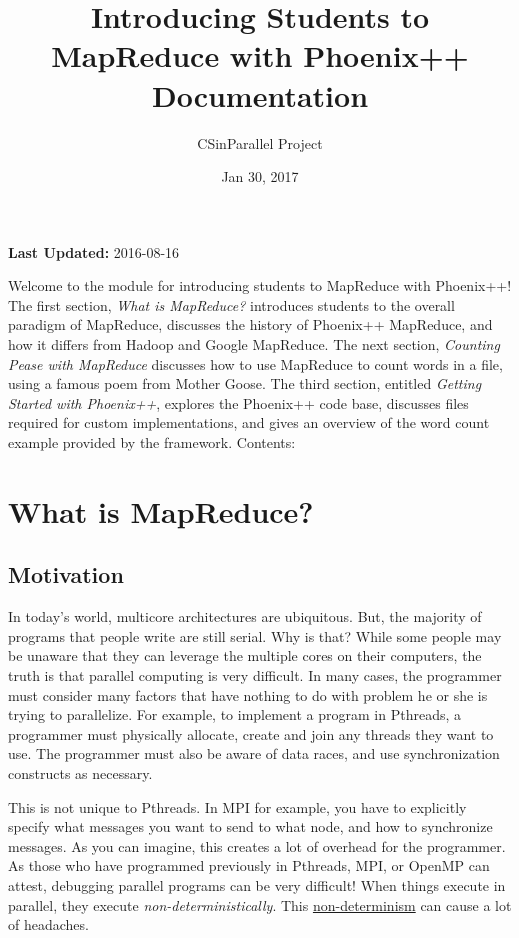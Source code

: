 \documentclass[letterpaper,10pt,openany,oneside]{sphinxmanual}
\title{Introducing Students to MapReduce with Phoenix++ Documentation}
\date{Jan 30, 2017}
\author{CSinParallel Project}
\begin{document}
\maketitle
\tableofcontents
{}\label{index::doc}


\textbf{Last Updated:} 2016-08-16

Welcome to the module for introducing students to MapReduce with Phoenix++!
The first section, \emph{What is MapReduce?} introduces students to the overall
paradigm of MapReduce, discusses the history of Phoenix++ MapReduce, and how it
differs from Hadoop and Google MapReduce. The next section, \emph{Counting Pease
with MapReduce} discusses how to use MapReduce to count words in a file, using
a famous poem from Mother Goose. The third section, entitled \emph{Getting Started
with Phoenix++}, explores the Phoenix++ code base, discusses files required for
custom implementations, and gives an overview of the word count example provided
by the framework.
Contents:


\chapter{What is MapReduce?}
\label{MRIntro/MRIntro::doc}\label{MRIntro/MRIntro:introducing-students-to-mapreduce-with-phoenix}\label{MRIntro/MRIntro:what-is-mapreduce}

\section{Motivation}
\label{MRIntro/MRIntro:motivation}
In today's world, multicore architectures are ubiquitous. But, the majority of
programs that people write are still serial. Why is that? While some people may
be unaware that they can leverage the multiple cores on their computers, the
truth is that parallel computing is very difficult. In many cases, the
programmer must consider many factors that have nothing to do with problem he
or she is trying to parallelize. For example, to implement a program in Pthreads,
a programmer must physically allocate, create and join any threads they want to
use. The programmer must also be aware of data races, and use synchronization
constructs as necessary.

This is not unique to Pthreads. In MPI for example, you have to explicitly
specify what messages you want to send to what node, and how to synchronize
messages. As you can imagine, this creates a lot of overhead for the
programmer. As those who have programmed previously in Pthreads, MPI, or OpenMP
can attest, debugging parallel programs can be very difficult! When things
execute in parallel, they execute \emph{non-deterministically}. This \href{https://en.wikipedia.org/wiki/Unbounded\_nondeterminism}{non-determinism}
can cause a lot of headaches.
\end{document}
